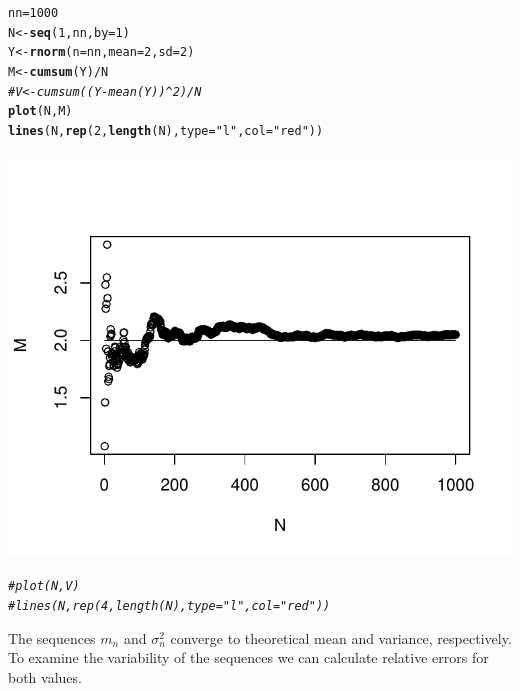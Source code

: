 \documentclass[12pt, a4paper]{article}\usepackage[]{graphicx}\usepackage[]{color}
\makeatletter
\def\maxwidth{ %
  \ifdim\Gin@nat@width>\linewidth
    \linewidth
  \else
    \Gin@nat@width
  \fi
}
\newcommand{\hlnum}[1]{\textcolor[rgb]{0.686,0.059,0.569}{#1}}%
\newcommand{\hlstr}[1]{\textcolor[rgb]{0.192,0.494,0.8}{#1}}%
\newcommand{\hlcom}[1]{\textcolor[rgb]{0.678,0.584,0.686}{\textit{#1}}}%
\newcommand{\hlopt}[1]{\textcolor[rgb]{0,0,0}{#1}}%
\newcommand{\hlstd}[1]{\textcolor[rgb]{0.345,0.345,0.345}{#1}}%
\newcommand{\hlkwb}[1]{\textcolor[rgb]{0.69,0.353,0.396}{#1}}%
\newcommand{\hlkwc}[1]{\textcolor[rgb]{0.333,0.667,0.333}{#1}}%
\newcommand{\hlkwd}[1]{\textcolor[rgb]{0.737,0.353,0.396}{\textbf{#1}}}%
\newenvironment{kframe}{%
 \def\at@end@of@kframe{}%
 \ifinner\ifhmode%
  \def\at@end@of@kframe{\end{minipage}}%
  \begin{minipage}{\columnwidth}%
 \fi\fi%
 \def\FrameCommand##1{\hskip\@totalleftmargin \hskip-\fboxsep
 \colorbox{shadecolor}{##1}\hskip-\fboxsep
     \hskip-\linewidth \hskip-\@totalleftmargin \hskip\columnwidth}%
 \MakeFramed {\advance\hsize-\width
   \@totalleftmargin\z@ \linewidth\hsize
   \@setminipage}}%
 {\par\unskip\endMakeFramed%
 \at@end@of@kframe}
\newenvironment{knitrout}{}{} %
\makeatother
\begin{document}
\begin{knitrout}
\color{fgcolor}\begin{kframe}
\begin{alltt}
\hlstd{nn} \hlkwb{=} \hlnum{1000}
\hlstd{N} \hlkwb{<-} \hlkwd{seq}\hlstd{(}\hlnum{1}\hlstd{, nn,} \hlkwc{by}\hlstd{=}\hlnum{1}\hlstd{)}
\hlstd{Y} \hlkwb{<-} \hlkwd{rnorm}\hlstd{(}\hlkwc{n} \hlstd{= nn,} \hlkwc{mean} \hlstd{=} \hlnum{2}\hlstd{,} \hlkwc{sd} \hlstd{=} \hlnum{2}\hlstd{)}
\hlstd{M} \hlkwb{<-} \hlkwd{cumsum}\hlstd{(Y)} \hlopt{/} \hlstd{N}
\hlcom{# V <- cumsum((Y - mean(Y)) ^ 2)/N}
\hlkwd{plot}\hlstd{(N, M)}
\hlkwd{lines}\hlstd{(N,} \hlkwd{rep}\hlstd{(}\hlnum{2}\hlstd{,} \hlkwd{length}\hlstd{(N),} \hlkwc{type} \hlstd{=} \hlstr{"l"}\hlstd{,} \hlkwc{col} \hlstd{=} \hlstr{"red"}\hlstd{))}
\end{alltt}
\end{kframe}

{\centering \includegraphics[width=\maxwidth]{figure/ex1_2seq-1} 

}


\begin{kframe}\begin{alltt}
\hlcom{# plot(N, V)}
\hlcom{# lines(N, rep(4, length(N), type = "l", col = "red"))}
\end{alltt}
\end{kframe}
\end{knitrout}

The sequences $m_n$ and $\sigma_n^2$ converge to theoretical mean and variance, respectively. To examine the variability of the sequences we can calculate relative errors for both values.
\end{document}
